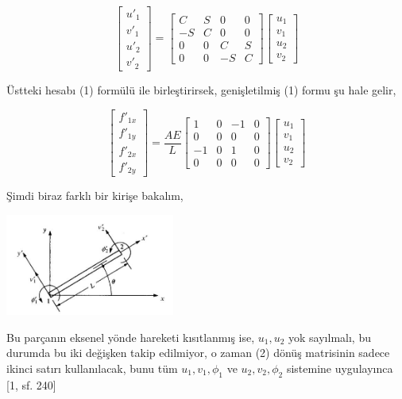 \documentclass[12pt,fleqn]{article}\usepackage{../../common}
\begin{document}
$$
\left[\begin{array}{c}
u'_1 \\ v'_1 \\ u'_2 \\ v'_2
\end{array}\right] =
\left[\begin{array}{cccc}
C & S & 0 & 0 \\
-S & C & 0 & 0 \\
0 & 0 & C & S \\
0 & 0 & -S & C 
\end{array}\right]
\left[\begin{array}{c}
u_1 \\ v_1 \\ u_2 \\ v_2
\end{array}\right]
$$

Üstteki hesabı (1) formülü ile birleştirirsek, genişletilmiş (1) formu şu hale
gelir,

$$
\left[\begin{array}{c}
f'_{1x} \\ f'_{1y} \\ f'_{2x} \\ f'_{2y} 
\end{array}\right] =
\frac{AE}{L}
\left[\begin{array}{cccc}
1 & 0 & -1 & 0 \\
0 & 0 & 0 & 0 \\
-1 & 0 & 1 & 0 \\
0 & 0 & 0 & 0
\end{array}\right]
\left[\begin{array}{c}
u_1 \\ v_1 \\ u_2 \\ v_2
\end{array}\right]
$$

Şimdi biraz farklı bir kirişe bakalım, 

\includegraphics[width=15em]{phy_020_strs_06_02.jpg}

Bu parçanın eksenel yönde hareketi kısıtlanmış ise, $u_1,u_2$ yok sayılmalı,
bu durumda bu iki değişken takip edilmiyor, o zaman (2) dönüş matrisinin
sadece ikinci satırı kullanılacak, bunu tüm $u_1,v_1,\phi_1$ ve $u_2,v_2,\phi_2$
sistemine uygulayınca [1, sf. 240]
\end{document}
